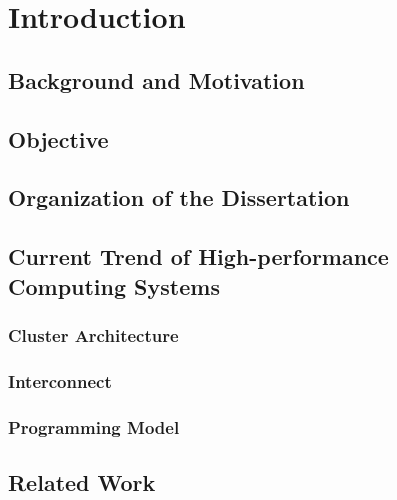 \chapter{Introduction}

\section{Background and Motivation}

\section{Objective}

\section{Organization of the Dissertation}

\section{Current Trend of High-performance Computing Systems}

\subsection{Cluster Architecture}

\subsection{Interconnect}

\subsection{Programming Model}

\section{Related Work}
